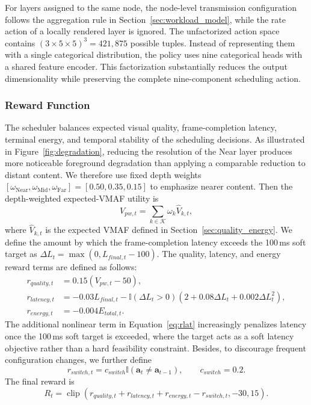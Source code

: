 \documentclass[acmsmall]{acmart}
\begin{document}
	For layers assigned to the same node, the node-level transmission configuration follows the aggregation rule in Section~\ref{sec:workload_model}, while the rate action of a locally rendered layer is ignored. The unfactorized action space contains $(3\times5\times5)^3=421{,}875$ possible tuples. Instead of representing them with a single categorical distribution, the policy uses nine categorical heads with a shared feature encoder. This factorization substantially reduces the output dimensionality while preserving the complete nine-component scheduling action.

	\subsubsection{Reward Function}
	\label{sec:reward}

	The scheduler balances expected visual quality, frame-completion latency, terminal energy, and temporal stability of the scheduling decisions. As illustrated in Figure~\ref{fig:degradation}, reducing the resolution of the Near layer produces more noticeable foreground degradation than applying a comparable reduction to distant content. We therefore use fixed depth weights $[\omega_{\mathrm{Near}},\omega_{\mathrm{Mid}},\omega_{\mathrm{Far}}]=[0.50,0.35,0.15]$ to emphasize nearer content.
	Then the depth-weighted expected-VMAF utility is
	\begin{equation}
		V_{pw,t}=\sum_{k\in\mathcal{K}}\omega_k\widehat V_{k,t},
		\label{eq:vpw_model}
	\end{equation}
	where $\widehat V_{k,t}$ is the expected VMAF defined in Section~\ref{sec:quality_energy}. We define the amount by which the frame-completion latency exceeds the 100\,ms soft target as $\Delta L_t=\max(0,L_{final,t}-100)$. The quality, latency, and energy reward terms are defined as follows:
	\begin{align}
		r_{quality,t} &= 0.15(V_{pw,t}-50), \label{eq:rqual}\\
		r_{latency,t} &= -0.03L_{final,t}-\mathbb{I}(\Delta L_t>0)
		\left(2+0.08\Delta L_t+0.002\Delta L_t^2\right), \label{eq:rlat}\\
		r_{energy,t} &= -0.004E_{total,t}.
	\end{align}
	The additional nonlinear term in Equation~\ref{eq:rlat} increasingly penalizes latency once the 100\,ms soft target is exceeded, where the target acts as a soft latency objective rather than a hard feasibility constraint. Besides, to discourage frequent configuration changes, we further define
	\begin{equation}
		r_{switch,t}=c_{switch}\mathbb{I}\!\left(\mathbf{a}_t\neq\mathbf{a}_{t-1}\right),
		\qquad c_{switch}=0.2.
		\label{eq:rswitch}
	\end{equation}
	The final reward is
	\begin{equation}
		R_t=\operatorname{clip}
		(r_{quality,t}+r_{latency,t}+r_{energy,t}-r_{switch,t},-30,15).
		\label{eq:reward}
	\end{equation}
\end{document}
